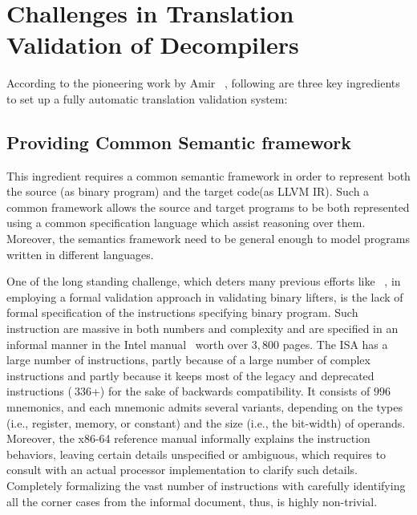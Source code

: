\section{Challenges in Translation Validation of
  Decompilers}\label{sec:challenges} According to the pioneering work by Amir
  \etal~\cite{Pnueli:1998}, following are three key ingredients to set up a
  fully automatic translation validation system:

\subsection{Providing Common Semantic framework} This ingredient requires a
common semantic framework in order to represent both the source (as \ISA binary
    program) and the target code(as LLVM IR). Such a common framework allows
the source and target programs to be both represented using a common
specification language which assist reasoning over them. Moreover, the
semantics framework need to be general enough to model programs written in
different languages.

One of the long standing challenge, which deters many previous efforts like
~\cite{ASE2017}, in employing a formal validation approach in validating
binary lifters, is the lack of formal specification of the \ISA instructions
specifying binary program. Such instruction are massive in both numbers and
complexity and are specified in an informal manner in the Intel
manual~\cite{IntelManual} worth over $3,800$ pages. The \ISA ISA has a large
number of instructions, partly because of a large number of complex
instructions and partly because it keeps most of the legacy and deprecated
instructions ($~336$+) for the sake of backwards compatibility. It consists of
$996$ mnemonics, and each mnemonic admits several variants, depending on the
types (i.e., register, memory, or constant) and the size (i.e., the bit-width)
  of operands. Moreover, the x86-64 reference manual informally explains the
  instruction behaviors, leaving certain details unspecified or ambiguous,
  which requires  to consult with an actual processor implementation to clarify
  such details. Completely formalizing the vast number of instructions with
  carefully identifying all the corner cases from the informal document, thus,
  is highly non-trivial.

